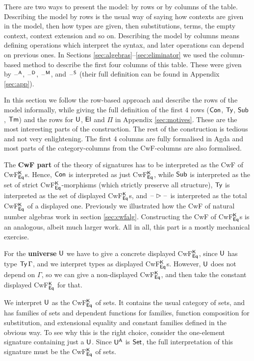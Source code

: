 \documentclass[acmsmall,screen]{acmart}
\begin{document}
There are two ways to present the model: by rows or by columns of the
table. Describing the model by rows is the usual way of saying how
contexts are given in the model, then how types are given, then
substitutions, terms, the empty context, context extension and so on.
Describing the model by columns means defining operations which
interpret the syntax, and later operations can depend on previous
ones. In Sections \ref{sec:algebras}--\ref{sec:eliminator} we used the
column-based method to describe the first four columns of this
table. These were given by $\mathord{\hspace{1pt}\text{--}\hspace{1pt}}^{\mathsf{A}}$, $\mathord{\hspace{1pt}\text{--}\hspace{1pt}}^{\mathsf{D}}$, $\mathord{\hspace{1pt}\text{--}\hspace{1pt}}^{\mathsf{M}}$, and
$\mathord{\hspace{1pt}\text{--}\hspace{1pt}}^{\mathsf{S}}$ (their full definition can be found in Appendix
\ref{sec:app}).

In this section we follow the row-based approach and describe the rows
of the model informally, while giving the full definition of the first
4 rows ($\mathsf{Con}$, $\mathsf{Ty}$, $\mathsf{Sub}$, $\mathsf{Tm}$) and the rows for $\mathsf{U}$, $\mathsf{El}$ and
$\Pi$ in Appendix \ref{sec:motives}. These are the most interesting
parts of the construction. The rest of the construction is tedious and
not very enlightening. The first 4 columns are fully formalised in
Agda and most parts of the category-columns from the CwF-columns are
also formalised.

The \textbf{CwF part} of the theory of signatures has to be
interpreted as the CwF of CwF$^{\mathsf{K}}_{\mathsf{Eq}}$s. Hence, $\mathsf{Con}$ is
interpreted as just CwF$^{\mathsf{K}}_{\mathsf{Eq}}$, while $\mathsf{Sub}$ is interpreted as the
set of strict CwF$^{\mathsf{K}}_{\mathsf{Eq}}$-morphisms (which strictly preserve all
structure), $\mathsf{Ty}$ is interpreted as the set of displayed
CwF$^{\mathsf{K}}_{\mathsf{Eq}}$s, and $\mathord{\hspace{1pt}\text{--}\hspace{1pt}}\rhd\mathord{\hspace{1pt}\text{--}\hspace{1pt}}$ is interpreted as the total
CwF$^{\mathsf{K}}_{\mathsf{Eq}}$ of a displayed one. Previously we illustrated how the
CwF of natural number algebras work in section
\ref{sec:cwfalg}. Constructing the CwF of CwF$^{\mathsf{K}}_{\mathsf{Eq}}$s is an
analogous, albeit much larger work. All in all, this part is a mostly
mechanical exercise.

For the \textbf{universe} $\mathsf{U}$ we have to give a concrete displayed
CwF$^{\mathsf{K}}_{\mathsf{Eq}}$, since $\mathsf{U}$ has type $\mathsf{Ty}\,\Gamma$, and we interpret
types as displayed CwF$^{\mathsf{K}}_{\mathsf{Eq}}$s.  However, $\mathsf{U}$ does not depend on
$\Gamma$, so we can give a non-displayed CwF$^{\mathsf{K}}_{\mathsf{Eq}}$, and then take
the constant displayed CwF$^{\mathsf{K}}_{\mathsf{Eq}}$ for that.

We interpret $\mathsf{U}$ as the CwF$^{\mathsf{K}}_{\mathsf{Eq}}$ of sets. It contains the
usual category of sets, and has families of sets and dependent
functions for families, function composition for substitution, and
extensional equality and constant families defined in the obvious way.
To see why this is the right choice, consider the one-element
signature containing just a $\mathsf{U}$. Since $\mathsf{U}^{\mathsf{A}}$ is $\mathsf{Set}$, the full
interpretation of this signature must be the CwF$^{\mathsf{K}}_{\mathsf{Eq}}$ of sets.
\end{document}
